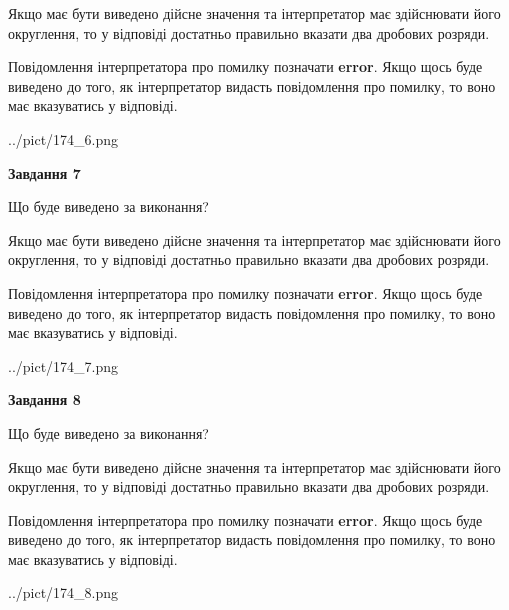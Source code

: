 \documentclass[12pt, ukrainian]{article}
\begin{document}
{\begin {Large}
Якщо має бути виведено дійсне значення та інтерпретатор має здійснювати його округлення, 
то у відповіді достатньо правильно вказати два дробових розряди.

Повідомлення інтерпретатора про помилку позначати \textbf{error}.
Якщо щось буде виведено до того, як інтерпретатор видасть повідомлення про помилку, 
то воно має вказуватись у відповіді. \par

\begin{center}
	{../pict/174_6.png}
\end{center}
\newpage

{\begin {center}\textbf{Завдання 7}\end {center}}\par
Що буде виведено за виконання? \par

Якщо має бути виведено дійсне значення та інтерпретатор має здійснювати його округлення, 
то у відповіді достатньо правильно вказати два дробових розряди.

Повідомлення інтерпретатора про помилку позначати \textbf{error}.
Якщо щось буде виведено до того, як інтерпретатор видасть повідомлення про помилку, 
то воно має вказуватись у відповіді. \par

\begin{center}
	{../pict/174_7.png}
\end{center}
\newpage

{\begin {center}\textbf{Завдання 8}\end {center}}\par
Що буде виведено за виконання? \par

Якщо має бути виведено дійсне значення та інтерпретатор має здійснювати його округлення, 
то у відповіді достатньо правильно вказати два дробових розряди.

Повідомлення інтерпретатора про помилку позначати \textbf{error}.
Якщо щось буде виведено до того, як інтерпретатор видасть повідомлення про помилку, 
то воно має вказуватись у відповіді. \par

\begin{center}
	{../pict/174_8.png}
\end{center}
\newpage


\end{Large}}
\end{document}
